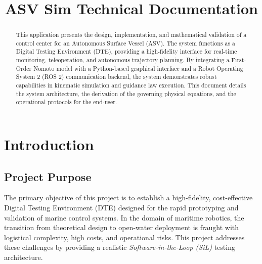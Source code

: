 \documentclass[12pt, a4paper, oneside]{report}
\title{\textbf{ASV Sim Technical Documentation}}
\begin{document}
\maketitle

\begin{abstract}
This application presents the design, implementation, and mathematical validation of a control center for an Autonomous Surface Vessel (ASV). The system functions as a Digital Testing Environment (DTE), providing a high-fidelity interface for real-time monitoring, teleoperation, and autonomous trajectory planning. By integrating a First-Order Nomoto model with a Python-based graphical interface and a Robot Operating System 2 (ROS 2) communication backend, the system demonstrates robust capabilities in kinematic simulation and guidance law execution. This document details the system architecture, the derivation of the governing physical equations, and the operational protocols for the end-user.
\end{abstract}

\tableofcontents
\newpage

\chapter{Introduction}
\label{ch:intro}

\section{Project Purpose}
The primary objective of this project is to establish a high-fidelity, cost-effective Digital Testing Environment (DTE) designed for the rapid prototyping and validation of marine control systems. In the domain of maritime robotics, the transition from theoretical design to open-water deployment is fraught with logistical complexity, high costs, and operational risks. This project addresses these challenges by providing a realistic \textit{Software-in-the-Loop (SiL)} testing architecture.
\end{document}

